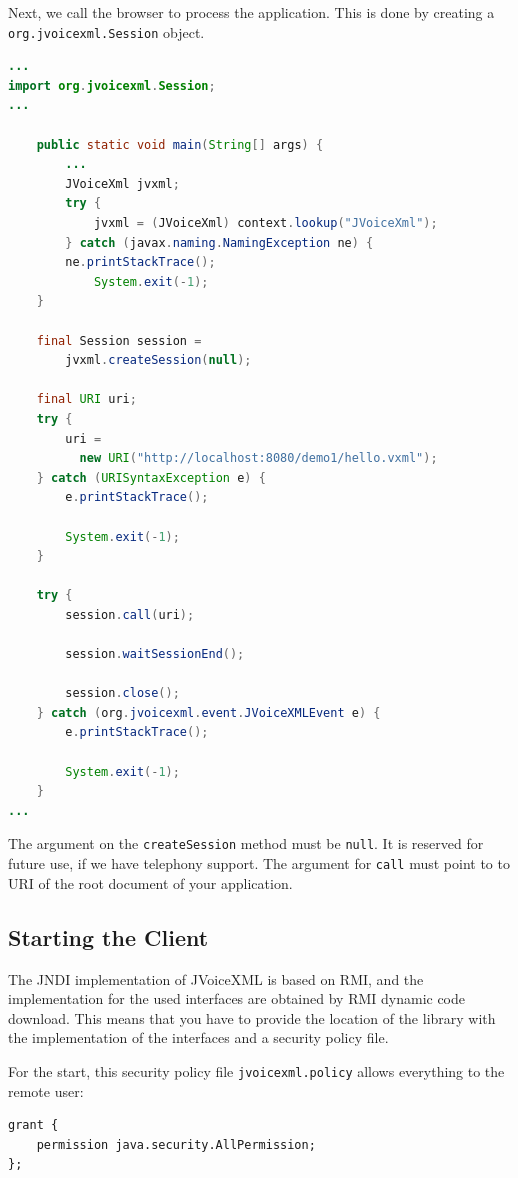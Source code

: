 \documentclass[11pt,a4paper]{article}
\begin{document}
Next, we call the browser to process the application. This is done
by creating a \texttt{org.jvoicexml.Session} object.

\begin{lstlisting}[language=Java]
...
import org.jvoicexml.Session;
...

    public static void main(String[] args) {
        ...
        JVoiceXml jvxml;
        try {
            jvxml = (JVoiceXml) context.lookup("JVoiceXml");
        } catch (javax.naming.NamingException ne) {
	    ne.printStackTrace();
            System.exit(-1);
    }

    final Session session = 
        jvxml.createSession(null);

    final URI uri;
    try {
        uri = 
          new URI("http://localhost:8080/demo1/hello.vxml");
    } catch (URISyntaxException e) {
        e.printStackTrace();

        System.exit(-1);
    }

    try {
        session.call(uri);

        session.waitSessionEnd();

        session.close();
    } catch (org.jvoicexml.event.JVoiceXMLEvent e) {
        e.printStackTrace();

        System.exit(-1);
    }
...
\end{lstlisting}

The argument on the \texttt{createSession} method must be 
\texttt{null}. It is reserved for future use, if we have telephony
support. The argument for \texttt{call} must point to to URI of the
root document of your application.

\subsection{Starting the Client}

The JNDI implementation of JVoiceXML is based on RMI, and
the implementation for the used interfaces are obtained by
RMI dynamic code download. This means that you have to provide
the location of the library with the implementation of the
interfaces and a security policy file.

For the start, this security policy file \texttt{jvoicexml.policy}
allows everything to the remote user:

\begin{lstlisting}
grant {
    permission java.security.AllPermission;
};
\end{lstlisting}
\end{document}
